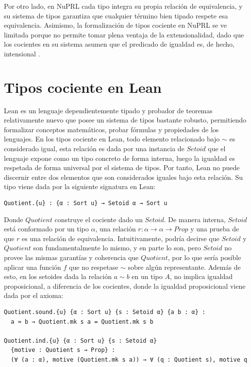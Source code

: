 Por otro lado, en NuPRL cada tipo integra su propia relación de equivalencia, y su sistema de tipos garantiza que cualquier término bien tipado respete esa equivalencia. Asimismo, la formalización de tipos cociente en NuPRL se ve limitada porque no permite tomar plena ventaja de la extensionalidad, dado que los cocientes en su sistema asumen que el predicado de igualdad es, de hecho, intensional \citep{nuprl}.
\section{Tipos cociente en Lean}
Lean es un lenguaje dependientemente tipado y probador de teoremas relativamente nuevo que posee un sistema de tipos bastante robusto, permitiendo formalizar conceptos matemáticos, probar fórmulas y propiedades de los lenguajes. En los tipos cociente en Lean, todo elemento relacionado bajo $\sim$ es considerado igual, esta relación es dada por una instancia de $Setoid$ que el lenguaje expone como un tipo concreto de forma interna, luego la igualdad es respetada de forma universal por el sistema de tipos. Por tanto, Lean no puede discernir entre dos elementos que son considerados iguales bajo esta relación. Su tipo viene dada por la siguiente signatura en Lean:
\begin{lstlisting}
Quotient.{u} : {α : Sort u} → Setoid α → Sort u
\end{lstlisting}

Donde $Quotient$ construye el cociente dado un $Setoid$. De manera interna, $Setoid$ está conformado por un tipo $\alpha$, una relación $r : \alpha \to \alpha \to Prop$ y una prueba de que $r$ es una relación de equivalencia. Intuitivamente, podría decirse que $Setoid$ y $Quotient$ son fundamentalmente lo mismo, y en parte lo son, pero $Setoid$ no provee las mismas garantías y coherencia que $Quotient$, por lo que sería posible aplicar una función $f$ que no respetase $\sim$ sobre algún representante. Además de esto, en los setoides dada la relación $a \sim b$ en un tipo $A$, no implica igualdad proposicional, a diferencia de los cocientes, donde la igualdad proposicional viene dada por el axioma:

\begin{lstlisting}
Quotient.sound.{u} {α : Sort u} {s : Setoid α} {a b : α} :
  a ≈ b → Quotient.mk s a = Quotient.mk s b

Quotient.ind.{u} {α : Sort u} {s : Setoid α}
  {motive : Quotient s → Prop} :
  (∀ (a : α), motive (Quotient.mk s a)) → ∀ (q : Quotient s), motive q
\end{lstlisting}

